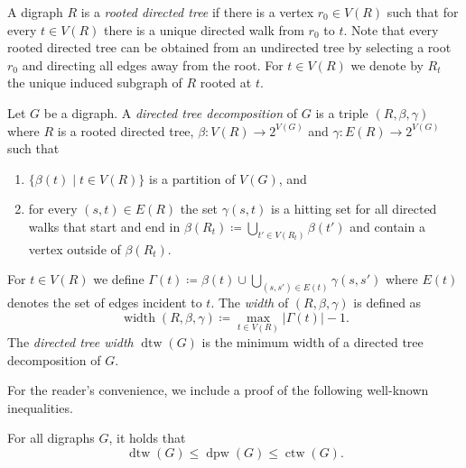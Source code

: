 \documentclass{theoretics}
\DeclareMathOperator{\width}{width}
\DeclareMathOperator{\dtw}{dtw}
\DeclareMathOperator{\dpw}{dpw}
\DeclareMathOperator{\ctw}{ctw}
\begin{document}
A digraph $R$ is a \emph{rooted directed tree} if there is a vertex $r_0 \in V(R)$ such that for every $t \in V(R)$ there is a unique directed walk from $r_0$ to $t$.
Note that every rooted directed tree can be obtained from an undirected tree by selecting a root $r_0$ and directing all edges away from the root.
For $t \in V(R)$ we denote by $R_t$ the unique induced subgraph of $R$ rooted at $t$.

Let $G$ be a digraph.
A \emph{directed tree decomposition} of $G$ is a triple $(R,\beta,\gamma)$ where $R$ is a rooted directed tree, $\beta\colon V(R) \to 2^{V(G)}$ and $\gamma\colon E(R) \to 2^{V(G)}$ such that
\begin{enumerate}[label = (D.\arabic*),leftmargin=*]
 \item\label{item:directed-tree-decomposition-1} $\{\beta(t) \mid t \in V(R)\}$ is a partition of $V(G)$, and
 \item\label{item:directed-tree-decomposition-2} for every $(s,t) \in E(R)$ the set $\gamma(s,t)$ is a hitting set for all directed walks that start and end in $\beta(R_t) \coloneqq \bigcup_{t' \in V(R_t)}\beta(t')$ and contain a vertex outside of $\beta(R_t)$.
\end{enumerate}
For $t \in V(R)$ we define $\Gamma(t) \coloneqq \beta(t) \cup \bigcup_{(s,s') \in E(t)} \gamma(s,s')$ where $E(t)$ denotes the set of edges incident to $t$.
The \emph{width} of $(R,\beta,\gamma)$ is defined as
\[\width(R,\beta,\gamma) \coloneqq \max_{t \in V(R)} |\Gamma(t)| - 1.\]
The \emph{directed tree width} $\dtw(G)$ is the minimum width of a directed tree decomposition of $G$.

For the reader's convenience, we include a proof of the following well-known inequalities.

\begin{proposition}
 For all digraphs $G$, it holds that
 \[\dtw(G) \leq \dpw(G) \leq \ctw(G).\]
\end{proposition}
\end{document}
